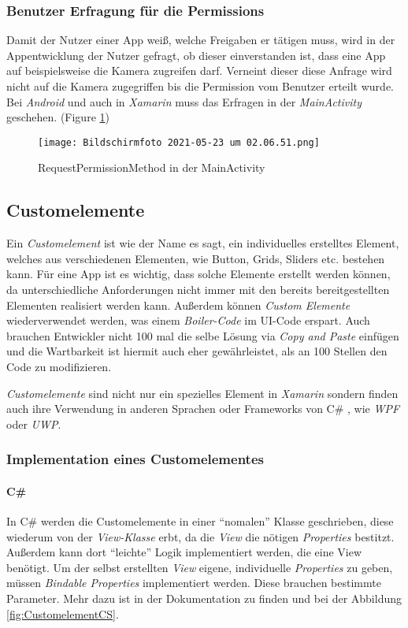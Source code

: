 \subsubsection{Benutzer Erfragung für die Permissions}
Damit der Nutzer einer App weiß, welche Freigaben er tätigen muss, wird in der Appentwicklung der Nutzer gefragt,
ob dieser einverstanden ist, dass eine App auf beispielsweise die Kamera zugreifen darf. Verneint dieser diese Anfrage
wird nicht auf die Kamera zugegriffen bis die Permission vom Benutzer erteilt wurde.
Bei \textit{Android} und auch in \textit{Xamarin} muss das Erfragen in der \textit{MainActivity} geschehen. (Figure \ref{fig:MainActivity})

\begin{figure}[hbt!]
    \centering
    \texttt{[image: Bildschirmfoto 2021-05-23 um 02.06.51.png]}
    \caption{RequestPermissionMethod in der MainActivity}
    \label{fig:MainActivity}
\end{figure}
\subsection{Customelemente}
Ein \textit{Customelement} ist wie der Name es sagt, ein individuelles erstelltes Element, welches aus verschiedenen Elementen, wie Button, Grids, Sliders etc. bestehen kann.
Für eine App ist es wichtig, dass solche Elemente erstellt werden können, da unterschiedliche Anforderungen nicht immer mit den bereits bereitgestellten Elementen realisiert werden kann.
Außerdem können \textit{Custom Elemente} wiederverwendet werden, was einem \textit{Boiler-Code} im UI-Code erspart.
Auch brauchen Entwickler nicht 100 mal die selbe Lösung via \textit{Copy and Paste} einfügen und die Wartbarkeit ist hiermit auch eher gewährleistet, als an 100 Stellen den Code zu modifizieren.

\textit{Customelemente} sind nicht nur ein spezielles Element in \textit{Xamarin} sondern finden auch ihre Verwendung in anderen Sprachen oder 
Frameworks von C\# , wie \textit{WPF} oder \textit{UWP}. 

\subsubsection{Implementation eines Customelementes}
\paragraph{C\#} In C\# werden die Customelemente in einer ``nomalen'' Klasse geschrieben, diese wiederum von der \textit{View-Klasse} erbt, da die \textit{View} die nötigen \textit{Properties} bestitzt.
Außerdem  kann dort "`leichte"' Logik implementiert werden, die eine View benötigt. Um der selbst erstellten \textit{View} eigene, individuelle \textit{Properties}
zu geben, müssen \textit{Bindable Properties} implementiert werden. Diese brauchen bestimmte Parameter. Mehr dazu ist in der Dokumentation zu finden und
bei der Abbildung \ref{fig:CustomelementCS}.


